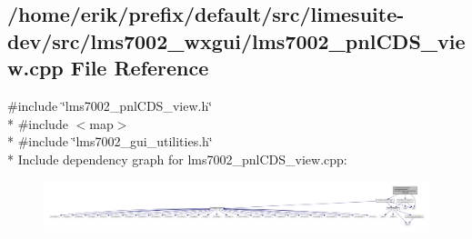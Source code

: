 \subsection{/home/erik/prefix/default/src/limesuite-\/dev/src/lms7002\+\_\+wxgui/lms7002\+\_\+pnl\+C\+D\+S\+\_\+view.cpp File Reference}
\label{lms7002__pnlCDS__view_8cpp}
{\ttfamily \#include \char`\"{}lms7002\+\_\+pnl\+C\+D\+S\+\_\+view.\+h\char`\"{}}\\*
{\ttfamily \#include $<$map$>$}\\*
{\ttfamily \#include \char`\"{}lms7002\+\_\+gui\+\_\+utilities.\+h\char`\"{}}\\*
Include dependency graph for lms7002\+\_\+pnl\+C\+D\+S\+\_\+view.\+cpp\+:
\nopagebreak
\begin{figure}[H]
\begin{center}
\leavevmode
\includegraphics[width=350pt]{d2/dea/lms7002__pnlCDS__view_8cpp__incl}
\end{center}
\end{figure}
